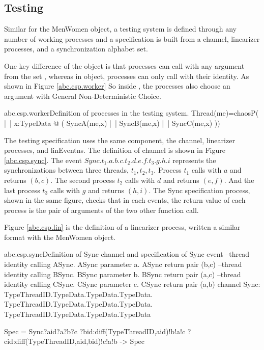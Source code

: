 \documentclass{article}
\begin{document}
\subsection{Testing}
Similar for the MenWomen object, a testing system is defined through any number of working processes and a specification is built from a  channel, linearizer processes, and a synchronization alphabet set. 

One key difference of the  object is that processes can call with any argument from the set , whereas in  object, processes can only call with their identity. As shown in Figure \ref{abc.csp.worker} So inside , the processes also choose an argument with General Non-Deterministic Choice. 

\begin{cspinline}{abc.csp.worker}{Definition of processes in the testing system.}
Thread(me)=chaosP( |~| x:TypeData @ (
    SyncA(me,x) 
  |~| SyncB(me,x) 
  |~| SyncC(me,x)
))
\end{cspinline}

The testing specification uses the same component, the  channel, linearizer processes, and linEventns. The definition of  channel is shown in Figure \ref{abc.csp.sync}. The event $Sync.t_1.a.b.c.t_2.d.e.f.t_3.g.h.i$ represents the synchronizations between three threads, $t_1,t_2,t_3$. Process $t_1$ calls  with $a$ and returns $(b,c)$. The second process $t_2$ calls  with $d$ and returns $(e,f)$. And the last process $t_3$ calls  with $g$ and returns $(h,i)$. The Sync specification process, shown in the same figure, checks that in each  events, the return value of each process is the pair of arguments of the two other function call. 

Figure \ref{abc.csp.lin} is the definition of a linearizer process, written a similar format with the MenWomen object.

\begin{cspinline}{abc.csp.sync}{Definition of Sync channel and specification of Sync event}
--thread identity calling ASync. ASync parameter a. ASync return pair (b,c)
--thread identity calling BSync. BSync parameter b. BSync return pair (a,c)
--thread identity calling CSync. CSync parameter c. CSync return pair (a,b)
channel Sync: TypeThreadID.TypeData.TypeData.TypeData.
              TypeThreadID.TypeData.TypeData.TypeData.
              TypeThreadID.TypeData.TypeData.TypeData

Spec = Sync?aid?a?b?c
           ?bid:diff(TypeThreadID,{aid})!b!a!c
           ?cid:diff(TypeThreadID,{aid,bid})!c!a!b 
    -> Spec
\end{cspinline}
\end{document}
